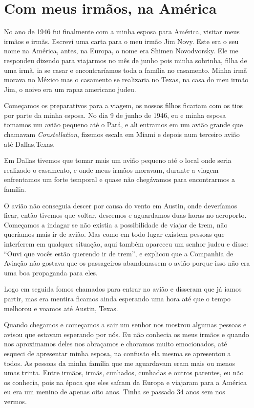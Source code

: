 \chapter{Com meus irmãos, na América}

No ano de 1946 fui finalmente com a minha esposa para América, visitar
meus irmãos e irmãs. Escrevi uma carta para o meu irmão Jim Novy. Este
era o seu nome na América, antes, na Europa, o nome era Shimen
Novodvorsky. Ele me respondeu dizendo para viajarmos no mês de junho
pois minha sobrinha, filha de uma irmã, ia se casar e encontraríamos
toda a família no casamento. Minha irmã morava no México mas o casamento
se realizaria no Texas, na casa do meu irmão Jim, o noivo era um rapaz
americano judeu.

Começamos os preparativos para a viagem, os nossos filhos ficariam com
os tios por parte da minha esposa. No dia 9 de junho de 1946, eu e minha
esposa tomamos um avião pequeno até o Pará, e ali entramos em um avião
grande que chamavam \textit{Constellation}, fizemos escala em Miami e depois num
terceiro avião até Dallas,Texas.

Em Dallas tivemos que tomar mais um avião pequeno até o local onde seria
realizado o casamento, e onde meus irmãos moravam, durante a viagem
enfrentamos um forte temporal e quase não chegávamos para encontrarmos a
família.

O avião não conseguia descer por causa do vento em Austin, onde
deveríamos ficar, então tivemos que voltar, descemos e aguardamos duas
horas no aeroporto. Começamos a indagar se não existia a possibilidade
de viajar de trem, não queríamos mais ir de avião. Mas como em todo
lugar existem pessoas que interferem em qualquer situação, aqui também
apareceu um senhor judeu e disse: ``Ouvi que vocês estão querendo ir de
trem'', e explicou que a Companhia de Aviação não gostava que os
passageiros abandonassem o avião porque isso não era uma boa propaganda
para eles.

Logo em seguida fomos chamados para entrar no avião e disseram que já
íamos partir, mas era mentira ficamos ainda esperando uma hora até que o
tempo melhorou e voamos até Austin, Texas.

Quando chegamos e começamos a sair um senhor nos mostrou algumas pessoas
e avisou que estavam esperando por nós. Eu não conhecia os meus irmãos e
quando nos aproximamos deles nos abraçamos e choramos muito emocionados,
até esqueci de apresentar minha esposa, na confusão ela mesma se
apresentou a todos. As pessoas da minha família que me aguardavam eram
mais ou menos umas trinta. Entre irmãos, irmãs, cunhados, cunhadas e
outros parentes, eu não os conhecia, pois na época que eles saíram da
Europa e viajaram para a América eu era um menino de apenas oito anos.
Tinha se passado 34 anos sem nos vermos.

